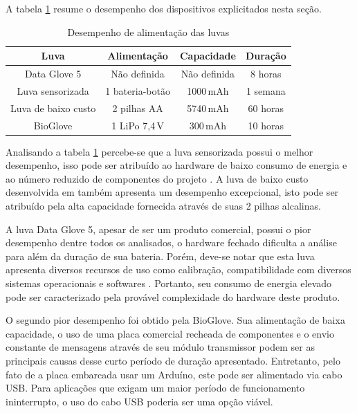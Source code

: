 \documentclass[
	12pt,				%
	openright,			%
	oneside,			%
	a4paper,			%
	english,			%
	brazil				%
	]{abntex2}
\begin{document}
			A tabela \ref{Tab:battery-range} resume o desempenho dos dispositivos explicitados nesta seção.

                          

		\begin{table}[H]
  	\centering
		\caption{Desempenho de alimentação das luvas}
    \begin{tabular}{c|c|c|c}
      \midrule
			Luva 								& Alimentação			&	Capacidade	& Duração	\\
      \midrule                                            					
			Data Glove 5				& Não definida		& Não definida& 8 horas \\
			Luva sensorizada 		& 1 bateria-botão	& 1000$\,$mAh		& 1 semana\\
			Luva de baixo custo & 2 pilhas AA			& 5740$\,$mAh		& 60 horas\\
			BioGlove						& 1 LiPo 7,4$\,$V			& 300$\,$mAh			&	10 horas\\	
      \midrule
    \end{tabular}
		\label{Tab:battery-range}
		\end{table}

		Analisando a tabela \ref{Tab:battery-range} percebe-se que a luva sensorizada possui o melhor desempenho, isso pode ser atribuído ao hardware de baixo consumo de energia e ao número reduzido de componentes do projeto \cite{michela2013rehab}. A luva de baixo custo desenvolvida em \cite{simone2007lowcost} também apresenta um desempenho excepcional, isto pode ser atribuído pela alta capacidade fornecida através de suas 2 pilhas alcalinas.

		A luva Data Glove 5, apesar de ser um produto comercial, possui o pior desempenho dentre todos os analisados, o hardware fechado dificulta a análise para além da duração de sua bateria. Porém, deve-se notar que esta luva apresenta diversos recursos de uso como calibração, compatibilidade com diversos sistemas operacionais e softwares \cite{5DT-ultra}. Portanto, seu consumo de energia elevado pode ser caracterizado pela provável complexidade do hardware deste produto.

		O segundo pior desempenho foi obtido pela BioGlove. Sua alimentação de baixa capacidade, o uso de uma placa comercial recheada de componentes e o envio constante de mensagens através de seu módulo transmissor podem ser as principais causas desse curto período de duração apresentado. Entretanto, pelo fato de a placa embarcada usar um Arduíno, este pode ser alimentado via cabo USB. Para aplicações que exigam um maior período de funcionamento ininterrupto, o uso do cabo USB poderia ser uma opção viável.
\end{document}
